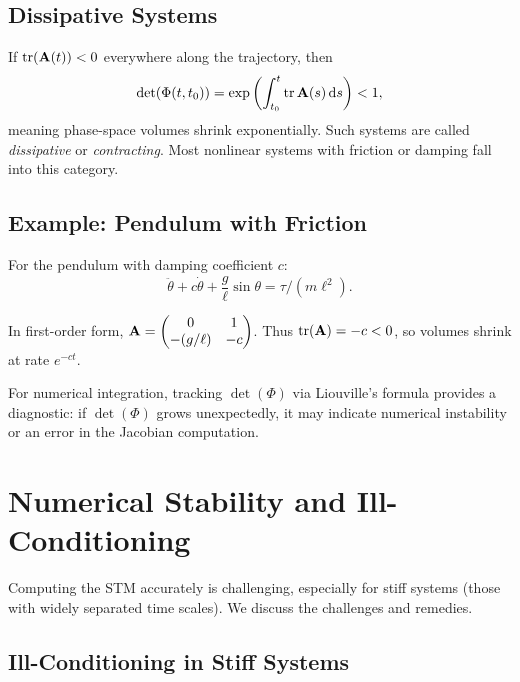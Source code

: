 \subsection{Dissipative Systems}

If $\operatorname{tr}(\mathbf{A}(t)) < 0$ everywhere along the trajectory, then
\begin{equation}
\det(\Phi(t,t_0)) = \exp\left(\int_{t_0}^{t}\operatorname{tr}\mathbf{A}(s)\,\mathrm{d} s\right) < 1,
\end{equation}
meaning phase-space volumes shrink exponentially. Such systems are called \emph{dissipative} or
\emph{contracting}. Most nonlinear systems with friction or damping fall into this category.

\subsection{Example: Pendulum with Friction}

For the pendulum with damping coefficient $c$:
\begin{equation}
\ddot\theta + c\dot\theta + \frac{g}{\ell}\sin\theta = \tau/(m\ell^2).
\end{equation}

In first-order form, $\mathbf{A} = \begin{pmatrix}0 & 1\\-(g/\ell) & -c\end{pmatrix}$.
Thus $\operatorname{tr}(\mathbf{A}) = -c < 0$, so volumes shrink at rate $e^{-ct}$.

\begin{warningbox}
For numerical integration, tracking $\det(\Phi)$ via Liouville's formula provides a diagnostic:
if $\det(\Phi)$ grows unexpectedly, it may indicate numerical instability or an error in the Jacobian computation.
\end{warningbox}


\section{Numerical Stability and Ill-Conditioning}

\label{sec:ch2:stability}

Computing the STM accurately is challenging, especially for stiff systems (those with widely separated
time scales). We discuss the challenges and remedies.

\subsection{Ill-Conditioning in Stiff Systems}


